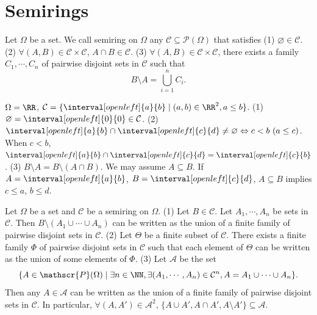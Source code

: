 \section{Semirings}
\begin{definitionenv}
    Let $\Omega$ be a set. We call semiring on $\Omega$ any $\mathcal{C}\subseteq \mathscr{P}(\Omega)$ that satisfies
    \newline
    (1) $\varnothing \in \mathcal{C}$.
    \newline
    (2) $\forall (A,B)\in \mathcal{C}\times \mathcal{C}$, $A\cap B\in \mathcal{C}$.
    \newline
    (3) $\forall (A,B)\in \mathcal{C}\times \mathcal{C}$, there exists a family $C_1,\cdots,C_n$ of pairwise disjoint sets in $\mathcal{C}$ such that 
    $$B\setminus A=\bigcup_{i=1}^{n}C_i.$$
\end{definitionenv}
\begin{exampleenv}
    $\Omega=\RR$, $\mathcal{C}=\{\interval[open left]{a}{b}\mid (a,b)\in \RR^2,a\le b\}$.
    \newline
    (1) $\varnothing=\interval[open left]{0}{0}\in \mathcal{C}$.
    \newline
    (2) $\interval[open left]{a}{b}\cap \interval[open left]{c}{d}\neq \varnothing\Leftrightarrow c<b\ (a\le c)$. When $c<b$, $\interval[open left]{a}{b}\cap \interval[open left]{c}{d}=\interval[open left]{c}{b}$.
    \newline
    (3) $B\setminus A=B\setminus\left(A\cap B\right)$. We may assume $A\subseteq B$. If $A=\interval[open left]{a}{b}$, $B=\interval[open left]{c}{d}$, $A\subseteq B$ implies $c\le a$, $b\le d$.
\end{exampleenv}
\begin{propositionenv}
    Let $\Omega$ be a set and $\mathcal{C}$ be a semiring on $\Omega$.
    \newline
    (1) Let $B\in \mathcal{C}$. Let $A_1,\cdots,A_n$ be sets in $\mathcal{C}$. Then $B\setminus \left(A_1\cup \cdots\cup A_n\right)$ can be written as the union of  a finite family of pairwise disjoint sets in $\mathcal{C}$.
    \newline
    (2) Let $\Theta$ be a finite subset of $\mathcal{C}$. There exists a finite family $\Phi$ of pairwise disjoint sets in $\mathcal{C}$ such that each element of $\Theta$ can be written as the union of some elements of $\Phi$.
    \newline
    (3) Let $\mathcal{A}$ be the set
    $$ \{A\in \mathscr{P}(\Omega)\mid \exists n\in\NN, \exists (A_1,\cdots,A_n)\in \mathcal{C}^n, A=A_1\cup \cdots\cup A_n\}.$$
    Then any $A\in\mathcal{A}$ can be written as the union of a finite family of pairwise disjoint sets in $\mathcal{C}$.
    In particular, $\forall (A,A')\in \mathcal{A}^2$, $\{A\cup A',A\cap A', A\setminus A'\}\subseteq \mathcal{A}$.
\end{propositionenv}
